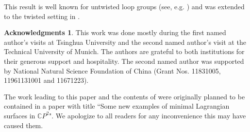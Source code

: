 \documentclass[a4paper,11pt]{amsart}
\theoremstyle{definition}
\newtheorem*{acknow}{Acknowledgments}
\numberwithin{equation}{section}
\begin{document}
This result is well known for untwisted loop groups (see, e.g. \cite{PS})  and was extended to the twisted setting in  \cite{DPW}.  

\begin{acknow}
This work was done mostly during the first named author’s visits at Tsinghua University and the second named author’s visit at the Technical University of Munich. The authors are grateful to both institutions for their generous support and hospitality. The second named author was supported by National Natural Science Foundation of China (Grant Nos. 11831005, 11961131001 and 11671223). 
\end{acknow}

 The work leading to this paper and the contents of \cite{DoMaB1} were  originally planned to be contained in a paper with title ``Some new examples of minimal Lagrangian surfaces in $\mathbb{C}P^2$".
 We apologize to all readers for any inconvenience this may have caused them.
\end{document}
